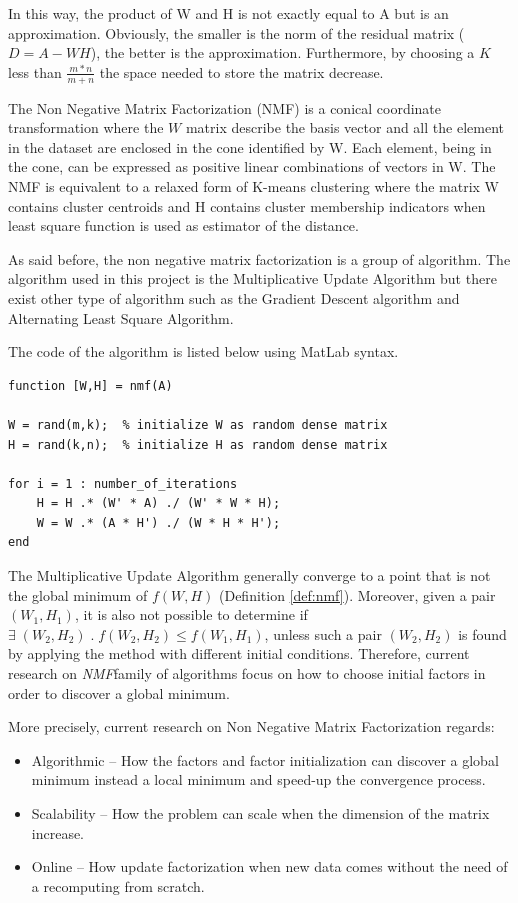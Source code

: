 \documentclass[a4paper,12pt]{article}
\newcommand{\nmf}{\textit{NMF}}
\begin{document}
In this way, the product of W and H is not exactly equal to A but is an approximation. 
Obviously, the smaller is the norm of the residual matrix ($D = A - WH$), the better is the approximation. 
Furthermore, by choosing a $K$ less than $\frac{m * n}{m + n} $ the space needed to store the matrix decrease.


The Non Negative Matrix Factorization (NMF) is a conical coordinate transformation\cite{Nikolaus07learningthe} where the $W$ matrix describe the basis vector and all the element in the dataset are enclosed in the cone identified by W. Each element, being in the cone, can be expressed as positive linear combinations of vectors in W. The NMF is equivalent to a relaxed form of K-means clustering where the matrix W contains cluster centroids and H contains cluster membership indicators when least square function is used as estimator of the distance.


As said before, the non negative matrix factorization is a group of algorithm. The algorithm used in this project is the Multiplicative Update Algorithm but there exist other type of algorithm such as the Gradient Descent algorithm\cite{gradient} and Alternating Least Square Algorithm\cite{least}. 

The code of the algorithm is listed below using MatLab syntax.
\begin{lstlisting}[style=matlab,label=code:nmf,caption=Pseudocode of the multiplicative update algorithm. The .* and ./ operators stand for element by element multiplication and division.]
function [W,H] = nmf(A)

W = rand(m,k);	% initialize W as random dense matrix 
H = rand(k,n);	% initialize H as random dense matrix 

for i = 1 : number_of_iterations
	H = H .* (W' * A) ./ (W' * W * H);
	W = W .* (A * H') ./ (W * H * H');
end
\end{lstlisting}

The Multiplicative Update Algorithm generally converge to a point that is not the global minimum of $f(W,H)$ (Definition \ref{def:nmf}).
Moreover, given a pair $(W_1,H_1)$, it is also not possible to determine if $\exists \; (W_2,H_2) \; . \;f(W_2,H_2) \leq f(W_1,H_1)$, unless such a pair $(W_2,H_2)$ is found by applying the method with different initial conditions. 
Therefore, current research on \nmf family of algorithms focus on how to choose initial factors in order to discover a global minimum.

More precisely, current research on Non Negative Matrix Factorization regards:
\begin{itemize}
  \item Algorithmic -- How the factors and factor initialization can discover a global minimum instead a local minimum and speed-up the convergence process.
   \item Scalability -- How the problem can scale when the dimension of the matrix increase.
    \item Online -- How update factorization when new data comes without the need of a recomputing from scratch.
\end{itemize}
\end{document}
